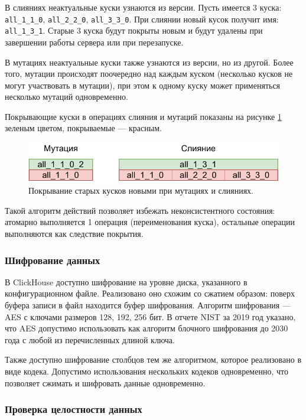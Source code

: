 В слияниях неактуальные куски узнаются из версии. Пусть имеется 3 куска: \texttt{all\_1\_1\_0},  \texttt{all\_2\_2\_0}, \texttt{all\_3\_3\_0}. При слиянии новый кусок получит имя: \texttt{all\_1\_3\_1}. Старые 3 куска будут покрыты \cite{covered} новым и будут удалены при завершении работы сервера или при перезапуске.

В мутациях неактуальные куски также узнаются из версии, но из другой. Более того, мутации происходят поочередно над каждым куском (несколько кусков не могут участвовать в мутации), при этом к одному куску может применяться несколько мутаций одновременно.

Покрывающие куски в операциях слияния и мутаций показаны на рисунке \ref{fig:cover} зеленым цветом, покрываемые --- красным.

\begin{figure}[hbtp]
	\centering
	\includegraphics[width=\textwidth]{img/cover.pdf}
	\caption{Покрывание старых кусков новыми при мутациях и слияниях.}
	\label{fig:cover}
\end{figure}

Такой алгоритм действий позволяет избежать неконсистентного состояния: атомарно выполняется 1 операция (переименования куска), остальные операции выполняются как следствие покрытия.

\subsubsection{Шифрование данных}

В ClickHouse доступно шифрование на уровне диска, указанного в конфигурационном файле. Реализовано оно схожим со сжатием образом: поверх буфера записи в файл находится буфер шифрования. Алгоритм шифрования --- AES с ключами размеров 128, 192, 256 бит. В отчете NIST \cite{nist} за 2019 год указано, что AES допустимо использовать как алгоритм блочного шифрования до 2030 года с любой из перечисленных длиной ключа.

Также доступно шифрование столбцов тем же алгоритмом, которое реализовано в виде кодека. Допустимо использования нескольких кодеков одновременно, что позволяет сжимать и шифровать данные одновременно.

\subsubsection{Проверка целостности данных}

